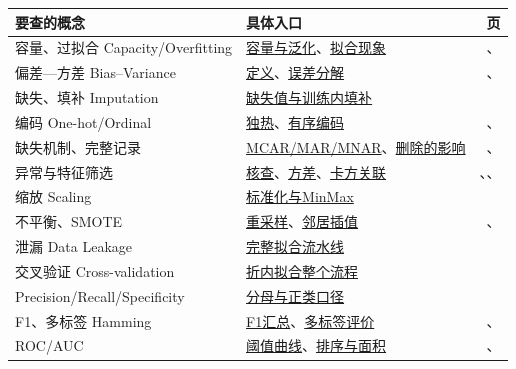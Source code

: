\begingroup
\setlength{\LTpre}{3pt}\setlength{\LTpost}{4pt}
\small
\begin{xltabular}{\textwidth}{P{52mm}Y r}
\toprule
要查的概念 & 具体入口 & 页\\
\midrule
\endhead
\bottomrule
\endfoot
容量、过拟合 Capacity/Overfitting & \hyperref[sec:learn-capacity]{容量与泛化}、\hyperref[sec:learn-fit]{拟合现象} & \pageref{sec:learn-capacity}、\pageref{sec:learn-fit}\\
偏差—方差 Bias--Variance & \hyperref[sec:learn-biasvariance]{定义}、\hyperref[sec:learn-decomposition]{误差分解} & \pageref{sec:learn-biasvariance}、\pageref{sec:learn-decomposition}\\
缺失、填补 Imputation & \hyperref[sec:data-missing]{缺失值与训练内填补} & \pageref{sec:data-missing}\\
编码 One-hot/Ordinal & \hyperref[sec:data-onehot]{独热}、\hyperref[sec:data-ordinal]{有序编码} & \pageref{sec:data-onehot}、\pageref{sec:data-ordinal}\\
缺失机制、完整记录 & \hyperref[sec:reliability-mechanism]{MCAR/MAR/MNAR}、\hyperref[sec:reliability-deletion]{删除的影响} & \pageref{sec:reliability-mechanism}、\pageref{sec:reliability-deletion}\\
异常与特征筛选 & \hyperref[sec:reliability-outlier]{核查}、\hyperref[sec:reliability-variance]{方差}、\hyperref[sec:reliability-chi2]{卡方关联} & \pageref{sec:reliability-outlier}、\pageref{sec:reliability-variance}、\pageref{sec:reliability-chi2}\\
缩放 Scaling & \hyperref[sec:data-scaling]{标准化与MinMax} & \pageref{sec:data-scaling}\\
不平衡、SMOTE & \hyperref[sec:data-sampling]{重采样}、\hyperref[sec:data-smote]{邻居插值} & \pageref{sec:data-sampling}、\pageref{sec:data-smote}\\
泄漏 Data Leakage & \hyperref[sec:data-pipeline]{完整拟合流水线} & \pageref{sec:data-pipeline}\\
交叉验证 Cross-validation & \hyperref[sec:eval-cv]{折内拟合整个流程} & \pageref{sec:eval-cv}\\
Precision/Recall/Specificity & \hyperref[sec:eval-precision-recall]{分母与正类口径} & \pageref{sec:eval-precision-recall}\\
F1、多标签 Hamming & \hyperref[sec:eval-f1]{F1汇总}、\hyperref[sec:eval-multilabel]{多标签评价} & \pageref{sec:eval-f1}、\pageref{sec:eval-multilabel}\\
ROC/AUC & \hyperref[sec:eval-roc]{阈值曲线}、\hyperref[sec:eval-auc]{排序与面积} & \pageref{sec:eval-roc}、\pageref{sec:eval-auc}\\

\end{xltabular}
